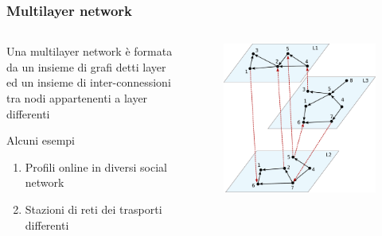 \begin{frame}
    \frametitle{Multilayer network}
    \begin{columns}
        \begin{column}{0.4\textwidth}
            \begin{definizione}
                Una \alert{multilayer network} è formata da un insieme di grafi
                detti \alert{layer} ed un insieme di \alert{inter-connessioni} 
                tra nodi appartenenti a layer differenti

            \end{definizione}
            \begin{exampleblock}{Alcuni esempi}
                \begin{enumerate}
                    \item Profili online in diversi social network
                    \item Stazioni di reti dei trasporti differenti
                \end{enumerate}
            \end{exampleblock}
        \end{column}
        \begin{column}{0.4\textwidth}
            \begin{figure}
                \centering
                \includegraphics[width=\textwidth]{img/mlexample.pdf}
            \end{figure}
        \end{column}
            
    \end{columns}
    

\end{frame}